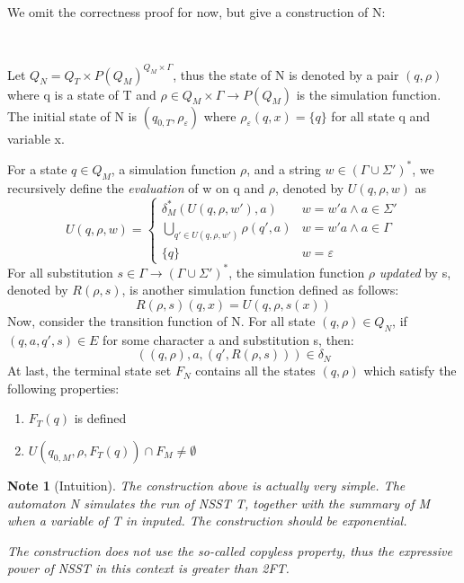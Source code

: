 \documentclass[sigplan,review,anonymous]{acmart}\settopmatter{printfolios=true,printccs=false,printacmref=false}
\newcommand{\tmtextit}[1]{{\itshape{#1}}}
\newtheorem{note}{Note}
\begin{document}
We omit the correctness proof for now, but give a construction of N:

\

Let $Q_N = Q_T \times P (Q_M)^{Q_M \times \Gamma}$, thus the state of N is
denoted by a pair $(q, \rho)$ where q is a state of T and $\rho \in Q_M \times
\Gamma \rightarrow P (Q_M)$ is the simulation function. The initial state of N
is $(q_{0, T}, \rho_{\varepsilon})$ where $\rho_{\varepsilon} (q, x) = \{ q
\}$ for all state q and variable x.

For a state $q \in Q_M$, a simulation function $\rho$, and a string $w \in
(\Gamma \cup \Sigma')^{\ast}$, we recursively define the \tmtextit{evaluation}
of w on q and $\rho$, denoted by $U (q, \rho, w)$ as
\[ U (q, \rho, w) = \left\{ \begin{array}{ll}
     \delta_M^{\ast} (U (q, \rho, w'), a) & w = w' a \wedge a \in \Sigma'\\
     \bigcup_{q' \in U (q, \rho, w')} \rho (q', a) & w = w' a \wedge a \in
     \Gamma\\
     \{ q \} & w = \varepsilon
   \end{array} \right. \]
For all substitution $s \in \Gamma \rightarrow (\Gamma \cup \Sigma')^{\ast}$,
the simulation function $\rho$ \tmtextit{updated} by s, denoted by $R (\rho,
s)$, is another simulation function defined as follows:
\[ R (\rho, s) (q, x) = U (q, \rho, s (x)) \]
Now, consider the transition function of N. For all state $(q, \rho) \in Q_N$,
if $(q, a, q', s) \in E$ for some character a and substitution s, then:
\[ ((q, \rho), a, (q', R (\rho, s))) \in \delta_N \]
At last, the terminal state set $F_N$ contains all the states $(q, \rho)$
which satisfy the following properties:
\begin{enumerate}
  \item $F_T (q)$ is defined
  
  \item $U (q_{0, M}, \rho, F_T (q)) \cap F_M \neq \emptyset$
\end{enumerate}


\begin{note}[Intuition]
  The construction above is actually very simple. The automaton N simulates
  the run of NSST T, together with the \tmtextit{summary} of M when a variable
  of T in inputed. The construction should be exponential.
  
  The construction does not use the so-called \tmtextit{copyless}
  property{\cite{AC10,AD11}},
  thus the expressive power of NSST in this context is greater than 2FT.
\end{note}
\end{document}
